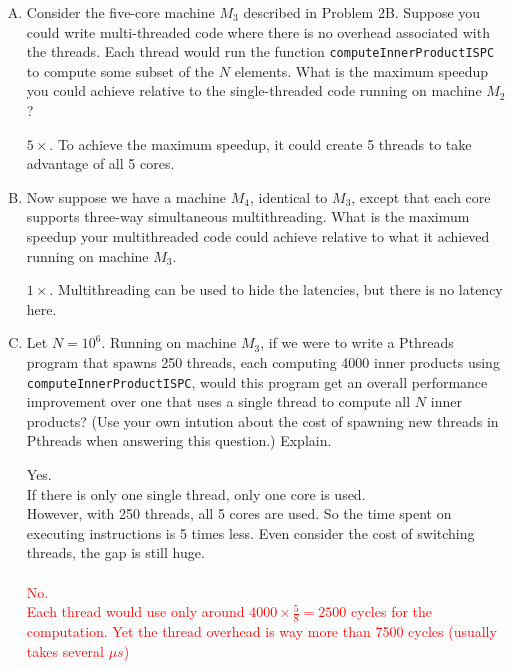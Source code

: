 \documentclass[11pt]{article}
\newenvironment{choice}{\begin{enumerate}[A.]}{\end{enumerate}}
\newenvironment{answer}{\begin{minipage}[c][1.5in]{\textwidth}}{\end{minipage}}
\begin{document}
\begin{choice}
\item
Consider the five-core machine $M_3$ described in Problem 2B\@.
Suppose you could write multi-threaded code where there is no overhead associated with the threads.  Each thread would run the function \texttt{computeInnerProductISPC} to compute some subset of the $N$ elements.
What is the maximum speedup you could achieve relative to the single-threaded code running on machine $M_2$?

\begin{answer}
$5\times$. To achieve the maximum speedup, it could create 5 threads to take advantage of all 5 cores. 

\end{answer}


\item
Now suppose we have a machine $M_4$, identical to $M_3$, except that
each core supports three-way simultaneous multithreading.  What is the
maximum speedup your multithreaded code could achieve relative to what it achieved running
on machine $M_3$.

\begin{answer}
$1\times$. Multithreading can be used to hide the latencies, but there is no latency here. 

\end{answer}

\item
Let $N = 10^6$.
Running on machine $M_3$, if we were to write a Pthreads program that spawns
  250 threads, each computing 4000 inner products using
  \texttt{computeInnerProductISPC}, would this program get an overall
  performance improvement over one that uses a single thread to compute all $N$ inner products?  
(Use your own intution about the cost of spawning new threads in Pthreads when answering this question.)
Explain.

\begin{answer}
Yes. \\
If there is only one single thread, only one core is used. \\
However, with 250 threads, all 5 cores are used. So the time spent on executing instructions is 5 times less. 
Even consider the cost of switching threads, the gap is still huge. \\ \\
\textcolor{red}{
  No. \\
  Each thread would use only around $4000\times \frac{5}{8}=2500$ cycles for the computation. 
  Yet the thread overhead is way more than 7500 cycles (usually takes several $\mu s$)
}


\end{answer}
\end{choice}
\end{document}
